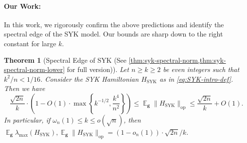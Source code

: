 \documentclass
[11pt,letterpaper]
{article}
\newtheorem{theorem}{Theorem}[section]
\theoremstyle{definition}
\newcommand{\1}{\mathbf{1}}
\DeclareMathOperator*{\E}{\mathbb{E}}
\renewcommand{\geq}{\geqslant}
\renewcommand{\leq}{\leqslant}
\newcommand{\syk}{\operatorname{SYK}}
\begin{document}
\paragraph{Our Work:} In this work, we rigorously confirm the above predictions and identify the spectral edge of the SYK model. Our bounds are sharp down to the right constant for large $k$.
\begin{theorem}[Spectral Edge of SYK (See \cref{thm:syk-spectral-norm,thm:syk-spectral-norm-lower} for full version)]\label{thm:main-thm-complete}
    Let $n\geq k\geq 2$ be even integers such that $k^2/n < 1/16$. Consider the SYK Hamiltonian $H_{\operatorname{SYK}}$ as in \eqref{eq:SYK-intro-def}. Then we have 
    \[{\frac{\sqrt{2n}}{k}}\cdot\left(1 - O(1)\cdot\max\left\{k^{-1/2}, \frac{k^4}{n^2}\right\}\right) \leq \E_{\bm g}\|H_{\operatorname{SYK}}\|_{\operatorname{op}}\leq\frac{\sqrt{2n}}{k} + O(1).\]
    In particular, if $\omega_n(1)\leq k\leq o(\sqrt{n})$, then $\E_{\bm{g}} \lambda_{\max}(H_{\syk}),  \E_{\bm g}\|H_{\operatorname{SYK}}\|_{\operatorname{op}} = (1 - o_n(1))\cdot\sqrt{2n}/k$.
\end{theorem}
\end{document}
